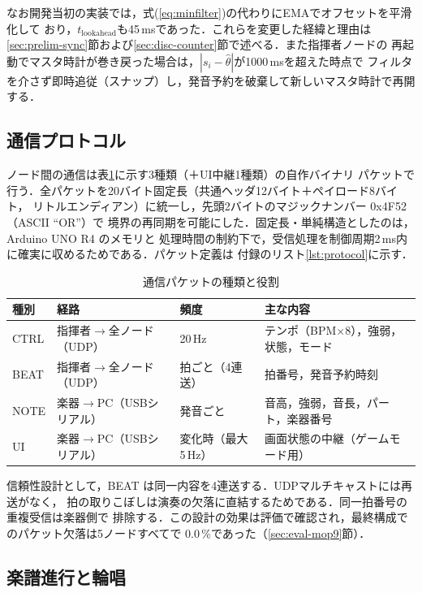 \documentclass[uplatex,dvipdfmx]{jlreq}
\begin{document}
なお開発当初の実装では，式(\ref{eq:minfilter})の代わりにEMAでオフセットを平滑化して
おり，$t_{\mathrm{lookahead}}$も45\,msであった．これらを変更した経緯と理由は
\ref{sec:prelim-sync}節および\ref{sec:disc-counter}節で述べる．また指揮者ノードの
再起動でマスタ時計が巻き戻った場合は，$|s_{i} - \hat{\theta}|$が1000\,msを超えた時点で
フィルタを介さず即時追従（スナップ）し，発音予約を破棄して新しいマスタ時計で再開する．

\subsection{通信プロトコル}\label{sec:protocol}

ノード間の通信は表\ref{tab:packets}に示す3種類（＋UI中継1種類）の自作バイナリ
パケットで行う．全パケットを20バイト固定長（共通ヘッダ12バイト＋ペイロード8バイト，
リトルエンディアン）に統一し，先頭2バイトのマジックナンバー 0x4F52（ASCII ``OR''）で
境界の再同期を可能にした．固定長・単純構造としたのは，Arduino UNO R4 のメモリと
処理時間の制約下で，受信処理を制御周期2\,ms内に確実に収めるためである．パケット定義は
付録のリスト\ref{lst:protocol}に示す．

\begin{table}[tbp]
  \centering
  \caption{通信パケットの種類と役割}\label{tab:packets}
  \small
  \setlength{\tabcolsep}{4pt}
  \begin{tabular}{llll}
    \hline
    種別 & 経路 & 頻度 & 主な内容 \\
    \hline
    CTRL & 指揮者$\to$全ノード（UDP） & 20\,Hz & テンポ（BPM$\times$8），強弱，状態，モード \\
    BEAT & 指揮者$\to$全ノード（UDP） & 拍ごと（4連送） & 拍番号，発音予約時刻 \\
    NOTE & 楽器$\to$PC（USBシリアル） & 発音ごと & 音高，強弱，音長，パート，楽器番号 \\
    UI & 楽器$\to$PC（USBシリアル） & 変化時（最大5\,Hz） & 画面状態の中継（ゲームモード用） \\
    \hline
  \end{tabular}
\end{table}

信頼性設計として，BEAT は同一内容を4連送する．UDPマルチキャストには再送がなく，
拍の取りこぼしは演奏の欠落に直結するためである．同一拍番号の重複受信は楽器側で
排除する．この設計の効果は評価で確認され，最終構成でのパケット欠落は5ノードすべてで
0.0\,\%であった（\ref{sec:eval-mop9}節）．

\subsection{楽譜進行と輪唱}\label{sec:score}
\end{document}
